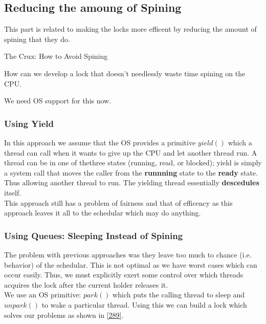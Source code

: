 \subsection{Reducing the amoung of Spining}

This part is related to making the locks more efficent by reducing the amount of
spining that they do.

\begin{tcolorbox}
    \begin{center}
        The Crux: How to Avoid Spining
    \end{center}

    How can we develop a lock that doesn't needlessly waste time spining on the
    CPU.
\end{tcolorbox}

We need OS support for this now.

\subsubsection{Using Yield}

In this approach we assume that the OS provides a primitive $yield()$ which a
thread can call when it wants to give up the CPU and let another thread run.
A thread can be in one of thethree states (running, read, or blocked); yield
is simply a system call that moves the caller from the \textbf{runnning} state
to the \textbf{ready} state. Thus allowing another thread to run. The yielding
thread essentially \textbf{descedules} itself.\\

This approach still has a problem of fairness and that of efficency as this 
approach leaves it all to the schedular which may do anything.

\subsubsection{Using Queues: Sleeping Instead of Spining}

The problem with previous approaches was they leave too much to chance (i.e.
behavior) of the schedular. This is not optimal as we have worst cases which
can occur easily. Thus, we must explicitly exert some control over which
threads acquires the lock after the current holder releases it.\\

We use an OS primitive: $park()$ which puts the calling thread to sleep and
$unpark()$ to wake a particular thread. Using this we can build a lock which
solves our problems as shown in \ref{289}.

